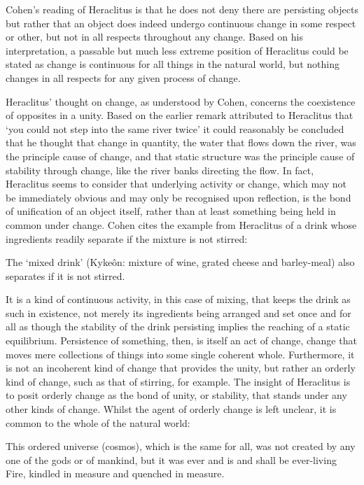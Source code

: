Cohen's reading of Heraclitus is that he does not deny there are persisting objects but rather that an object does indeed undergo continuous change in some respect or other, but not in all respects throughout any change. \parencite[][]{cohen-heracli} Based on his interpretation, a passable but much less extreme position of Heraclitus could be stated as change is continuous for all things in the natural world, but nothing changes in all respects for any given process of change.

Heraclitus' thought on change, as understood by Cohen, concerns the coexistence of opposites in a unity. Based on the earlier remark attributed to Heraclitus that `you could not step into the same river twice' it could reasonably be concluded that he thought that change in quantity, the water that flows down the river, was the principle cause of change, and that static structure was the principle cause of stability through change, like the river banks directing the flow. In fact, Heraclitus seems to consider that underlying activity or change, which may not be immediately obvious and may only be recognised upon reflection, is the bond of unification of an object itself, rather than at least something being held in common under change. Cohen cites the example from Heraclitus of a drink whose ingredients readily separate if the mixture is not stirred:
\begin{quoting}
The `mixed drink' (Kyke\^on: mixture of wine, grated cheese and barley-meal) also separates if it is not stirred. \parencite[][34]{fitt1983ancilla}
\end{quoting}
It is a kind of continuous activity, in this case of mixing, that keeps the drink as such in existence, not merely its ingredients being arranged and set once and for all as though the stability of the drink persisting implies the reaching of a static equilibrium. Persistence of something, then, is itself an act of change, change that moves mere collections of things into some single coherent whole. Furthermore, it is not an incoherent kind of change that provides the unity, but rather an orderly kind of change, such as that of stirring, for example. The insight of Heraclitus is to posit orderly change as the bond of unity, or stability, that stands under any other kinds of change. Whilst the agent of orderly change is left unclear, it is common to the whole of the natural world:
\begin{quoting}
This ordered universe (cosmos), which is the same for all, was not created by any one of the gods or of mankind, but it was ever and is and shall be ever-living Fire, kindled in measure and quenched in measure. \parencite[][27]{fitt1983ancilla}
\end{quoting}


